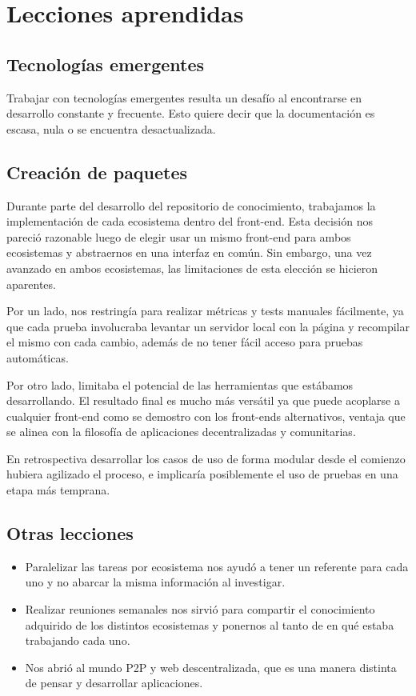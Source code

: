 \section{Lecciones aprendidas}

\subsection{Tecnologías emergentes}

Trabajar con tecnologías emergentes resulta un desafío al encontrarse en desarrollo constante y frecuente. Esto quiere decir que la documentación es escasa, nula o se encuentra desactualizada.

\subsection{Creación de paquetes}
Durante parte del desarrollo del repositorio de conocimiento, trabajamos la implementación de cada ecosistema dentro del front-end. Esta decisión nos pareció razonable luego de elegir usar un mismo front-end para ambos ecosistemas y abstraernos en una interfaz en común. Sin embargo, una vez avanzado en ambos ecosistemas, las limitaciones de esta elección se hicieron aparentes.

Por un lado, nos restringía para realizar métricas y tests manuales fácilmente, ya que cada prueba involucraba levantar un servidor local con la página y recompilar el mismo con cada cambio, además de no tener fácil acceso para pruebas automáticas.

Por otro lado, limitaba el potencial de las herramientas que estábamos desarrollando. El resultado final es mucho más versátil ya que puede acoplarse a cualquier front-end como se demostro con los front-ends alternativos, ventaja que se alinea con la filosofía de aplicaciones decentralizadas y comunitarias.

En retrospectiva desarrollar los casos de uso de forma modular desde el comienzo hubiera agilizado el proceso, e implicaría posiblemente el uso de pruebas en una etapa más temprana.

\subsection{Otras lecciones}

\begin{itemize}
    \item Paralelizar las tareas por ecosistema nos ayudó a tener un referente para cada uno y no abarcar la misma información al investigar.

    \item Realizar reuniones semanales nos sirvió para compartir el conocimiento adquirido de los distintos ecosistemas y ponernos al tanto de en qué estaba trabajando cada uno.

    \item Nos abrió al mundo P2P y web descentralizada, que es una manera distinta de pensar y desarrollar aplicaciones.

\end{itemize}
